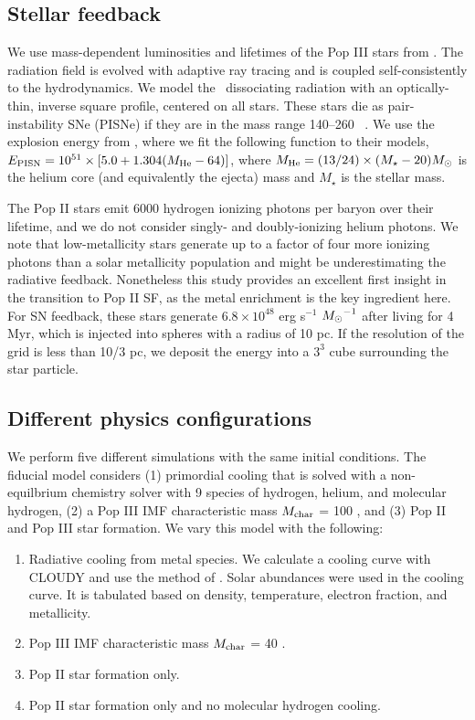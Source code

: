 \documentclass[useAMS,usenatbib]{mn2e}
\begin{document}
\subsection{Stellar feedback}

We use mass-dependent luminosities and lifetimes of the Pop III stars
from \citet{Schaerer02}.  The radiation field is evolved with adaptive
ray tracing \citep{Abel02_RT, Wise10} and is coupled self-consistently
to the hydrodynamics.  We model the \hh~dissociating radiation with an
optically-thin, inverse square profile, centered on all stars.  These
stars die as pair-instability SNe (PISNe) if they are in the mass
range 140--260 \Ms~\citep{Heger03}.  We use the explosion energy from
\citet{Heger02}, where we fit the following function to their models,
$E_{\rm PISN} = 10^{51} \times [5.0 + 1.304 (M_{\rm He} - 64)]$, where
$M_{\rm He} = (13/24) \times (M_\star - 20) \Ms$ is the helium core
(and equivalently the ejecta) mass and $M_\star$ is the stellar mass.

The Pop II stars emit 6000 hydrogen ionizing photons per baryon over
their lifetime, and we do not consider singly- and doubly-ionizing
helium photons.  We note that low-metallicity stars generate up to a
factor of four more ionizing photons than a solar metallicity
population \citep{Schaerer03} and might be underestimating the
radiative feedback.  Nonetheless this study provides an excellent
first insight in the transition to Pop II SF, as the metal enrichment
is the key ingredient here.  For SN feedback, these stars generate
$6.8 \times 10^{48}$ erg s$^{-1}$ $\Ms^{-1}$ after living for 4 Myr,
which is injected into spheres with a radius of 10 pc.  If the
resolution of the grid is less than 10/3 pc, we deposit the energy
into a $3^3$ cube surrounding the star particle.

\subsection{Different physics configurations}

We perform five different simulations with the same initial
conditions.  The fiducial model considers (1) primordial cooling that
is solved with a non-equilbrium chemistry solver with 9 species of
hydrogen, helium, and molecular hydrogen, (2) a Pop III IMF
characteristic mass $M_{\rm char}$ = 100 \Ms, and (3) Pop II and Pop
III star formation.  We vary this model with the following:

\begin{enumerate}
\item Radiative cooling from metal species.  We calculate a cooling
  curve with CLOUDY \citep{CLOUDY} and use the method of
  \citep{2008MNRAS.385.1443S}.  Solar abundances were used in the
  cooling curve.  It is tabulated based on density, temperature,
  electron fraction, and metallicity.
\item Pop III IMF characteristic mass $M_{\rm char}$ = 40 \Ms.
\item Pop II star formation only.
\item Pop II star formation only and no molecular hydrogen cooling.
\end{enumerate}
\end{document}
